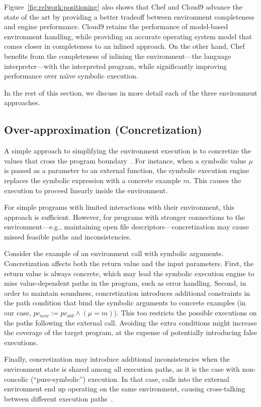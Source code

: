 Figure~\ref{fig:relwork:positioning} also shows that Chef and Cloud9 advance the state of the art by providing a better tradeoff between environment completeness and engine performance.
%
Cloud9 retains the performance of model-based environment handling, while providing an accurate operating system model that comes closer in completeness to an inlined approach.
%
On the other hand, Chef benefits from the completeness of inlining the environment---the language interpreter---with the interpreted program, while significantly improving performance over na\"{\i}ve symbolic execution.

In the rest of this section, we discuss in more detail each of the three environment approaches.

\subsection{Over-approximation (Concretization)}

A simple approach to simplifying the environment execution is to concretize the values that cross the program boundary~\cite{dart,godefroid:fuzz,klee}.
%
For instance, when a symbolic value $\mu$ is passed as a parameter to an external function, the symbolic execution engine replaces the symbolic expression with a concrete example $m$.  This causes the execution to proceed linearly inside the environment.

For simple programs with limited interactions with their environment, this approach is sufficient.  However, for programs with stronger connections to the environment---e.g., maintaining open file descriptors---concretization may cause missed feasible paths and inconsistencies.

Consider the example of an environment call with symbolic arguments.  Concretization affects both the return value and the input parameters.
%
First, the return value is always concrete, which may lead the symbolic execution engine to miss value-dependent paths in the program, such as error handling.
%
Second, in order to maintain soundness, concretization introduces additional constraints in the path condition that bind the symbolic arguments to concrete examples (in our case, $pc_{new} := pc_{old} \wedge (\mu = m)$).  This too restricts the possible executions on the paths following the external call.
%
Avoiding the extra conditions might increase the coverage of the target program, at the expense of potentially introducing false executions.

Finally, concretization may introduce additional inconsistencies when the environment state is shared among all execution paths, as it is the case with non-concolic (``pure-symbolic'') execution.  In that case, calls into the external environment end up operating on the same environment, causing cross-talking between different execution paths~\cite{klee}.


